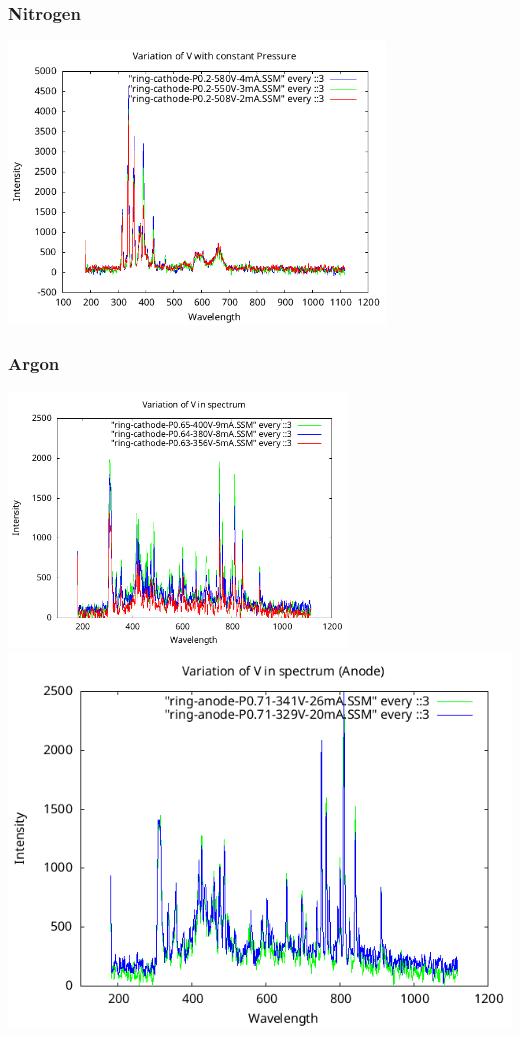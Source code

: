 \documentclass[]{report}[12 pt]
\begin{document}
\subsubsection{Nitrogen}
\begin{center}
	\includegraphics[width=10cm]{VvsP0.2N.png}
\end{center}
\subsubsection{Argon}
\begin{center}
	\includegraphics[width=9cm]{P0.64VAr.png}
	\includegraphics[width=9 cm]{P0.71V(anode)Ar.png}
\end{center}
\end{document}
